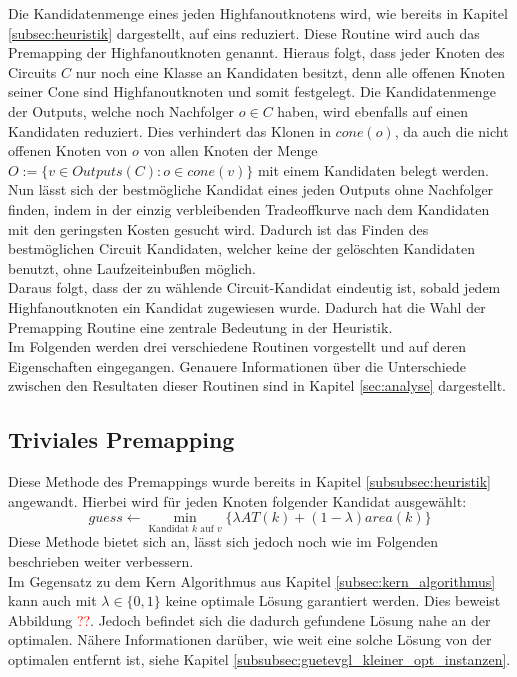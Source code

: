 \documentclass[11pt, a4paper, german]{article}
\begin{document}
 Die Kandidatenmenge eines jeden Highfanoutknotens wird, wie bereits in Kapitel \ref{subsec:heuristik} dargestellt, auf eins reduziert. Diese Routine wird auch das Premapping der Highfanoutknoten genannt. Hieraus folgt, dass jeder Knoten des Circuits $C$ nur noch eine Klasse an Kandidaten besitzt, denn alle offenen Knoten seiner Cone sind Highfanoutknoten und somit festgelegt.  Die Kandidatenmenge der Outputs, welche noch Nachfolger $o \in C$ haben, wird ebenfalls auf einen Kandidaten reduziert. Dies verhindert das Klonen in $cone(o)$, da  auch die nicht offenen Knoten von $o$ von allen Knoten der Menge $O := \{ v \in Outputs(C): o \in cone(v) \}$ mit einem Kandidaten belegt werden.\\
Nun lässt sich der bestmögliche Kandidat eines jeden Outputs ohne Nachfolger finden, indem in der einzig verbleibenden Tradeoffkurve nach dem Kandidaten mit den geringsten Kosten gesucht wird. Dadurch ist das Finden des  bestmöglichen Circuit Kandidaten,  welcher keine der gelöschten Kandidaten benutzt, ohne Laufzeiteinbußen möglich. \\
Daraus folgt, dass der zu wählende Circuit-Kandidat eindeutig ist, sobald jedem Highfanoutknoten ein Kandidat zugewiesen wurde. Dadurch hat die Wahl der Premapping Routine eine zentrale Bedeutung in der Heuristik.\\
Im Folgenden werden drei verschiedene Routinen vorgestellt und auf deren Eigenschaften eingegangen. Genauere Informationen über die Unterschiede zwischen den Resultaten dieser Routinen sind in Kapitel \ref{sec:analyse} dargestellt.

\subsection{Triviales Premapping}
\label{subsec:triviales_premapping}
Diese Methode des Premappings wurde bereits in Kapitel \ref{subsubsec:heuristik} angewandt. Hierbei wird für jeden Knoten folgender Kandidat ausgewählt: \[ guess \gets \min\limits_{\text{Kandidat }k\text{ auf }v}\{ \lambda AT(k) + (1-\lambda) area(k)  \} \]
Diese Methode bietet sich an, lässt sich jedoch noch wie im Folgenden beschrieben weiter verbessern.\\

Im Gegensatz zu dem Kern Algorithmus aus Kapitel \ref{subsec:kern_algorithmus} kann auch mit $\lambda \in \{ 0 , 1\}$ keine optimale Lösung garantiert werden. Dies beweist Abbildung \textcolor{red}{??}. Jedoch befindet sich die dadurch gefundene Lösung nahe an der optimalen. Nähere Informationen darüber, wie weit eine solche Lösung von der optimalen entfernt ist, siehe Kapitel \ref{subsubsec:guetevgl_kleiner_opt_instanzen}.
 
\end{document}
